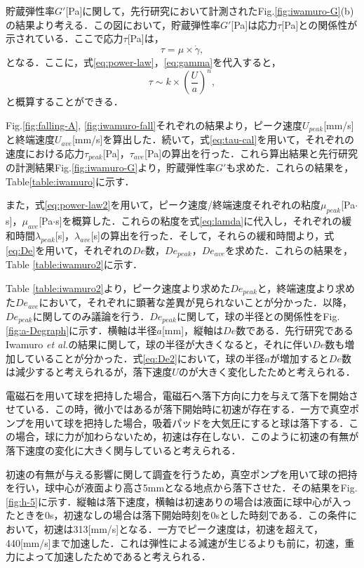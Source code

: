 貯蔵弾性率$G'$[Pa]に関して，先行研究において計測されたFig.\ref{fig:iwamuro-G}(b)の結果より考える．この図において，貯蔵弾性率$G'$[Pa]は応力$\tau$[Pa]との関係性が示されている．ここで応力$\tau$[Pa]は，
\begin{equation}
    \tau = \mu \times \dot{\gamma} ,
    \label{eq:tau}
\end{equation}
となる．ここに，式\ref{eq:power-law}，\ref{eq:gamma}を代入すると，
\begin{equation}
    \tau \sim k \times \left(\frac{U}{a}\right)^n , 
    \label{eq:tau-cal}
\end{equation}
と概算することができる．

Fig.\ref{fig:falling-A}, \ref{fig:iwamuro-fall}それぞれの結果より，ピーク速度$U_{peak}$[mm/s]と終端速度$U_{ave}$[mm/s]を算出した．続いて，式\ref{eq:tau-cal}を用いて，それぞれの速度における応力$\tau_{peak}$[Pa]，$\tau_{ave}$[Pa]の算出を行った．これら算出結果と先行研究の計測結果Fig.\ref{fig:iwamuro-G}より，貯蔵弾性率$G'$も求めた．これらの結果を，Table\ref{table:iwamuro}に示す．

また，式\ref{eq:power-law2}を用いて，ピーク速度/終端速度それぞれの粘度$\mu_{peak}$[Pa$\cdot$s]，$\mu_{ave}$[Pa$\cdot$s]を概算した．これらの粘度を式\ref{eq:lamda}に代入し，それぞれの緩和時間$\lambda_{peak}$[s]，$\lambda_{ave}$[s]の算出を行った．そして，それらの緩和時間より，式\ref{eq:De}を用いて，それぞれの$De$数，$De_{peak}$，$De_{ave}$を求めた．これらの結果を，Table \ref{table:iwamuro2}に示す．

Table \ref{table:iwamuro2}より，ピーク速度より求めた$De_{peak}$と，終端速度より求めた$De_{ave}$において，それぞれに顕著な差異が見られないことが分かった．以降，$De_{peak}$に関してのみ議論を行う．$De_{peak}$に関して，球の半径との関係性をFig.\ref{fig:a-Degraph}に示す．横軸は半径$a$[mm]，縦軸は$De$数である．先行研究であるIwamuro \textit{et al.}\cite{ref:8}の結果に関して，球の半径が大きくなると，それに伴い$De$数も増加していることが分かった．式\ref{eq:De2}において，球の半径$a$が増加すると$De$数は減少すると考えられるが，落下速度$U$のが大きく変化したためと考えられる．

電磁石を用いて球を把持した場合，電磁石へ落下方向に力を与えて落下を開始させている．この時，微小ではあるが落下開始時に初速が存在する．一方で真空ポンプを用いて球を把持した場合，吸着パッドを大気圧にすると球は落下する．この場合，球に力が加わらないため，初速は存在しない．このように初速の有無が落下速度の変化に大きく関与していると考えられる．

初速の有無が与える影響に関して調査を行うため，真空ポンプを用いて球の把持を行い，球中心が液面より高さ5mmとなる地点から落下させた．その結果をFig.\ref{fig:h-5}に示す．縦軸は落下速度，横軸は初速ありの場合は液面に球中心が入ったときを0s，初速なしの場合は落下開始時刻を0sとした時刻である．この条件において，初速は313[mm/s]となる．一方でピーク速度は，初速を超えて，440[mm/s]まで加速した．これは弾性による減速が生じるよりも前に，初速，重力によって加速したためであると考えられる．


